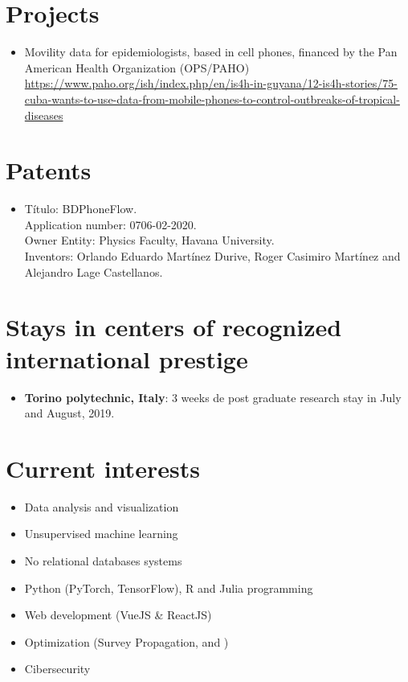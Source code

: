 \documentclass[11pt]{article} %
\begin{document}
\section*{Projects}

\begin{itemize}
	\item Movility data for epidemiologists, based in cell phones, financed by the Pan American Health Organization (OPS/PAHO)\\ \href{https://www.paho.org/ish/index.php/en/is4h-in-guyana/12-is4h-stories/75-cuba-wants-to-use-data-from-mobile-phones-to-control-outbreaks-of-tropical-diseases}{https://www.paho.org/ish/index.php/en/is4h-in-guyana/12-is4h-stories/75-cuba-wants-to-use-data-from-mobile-phones-to-control-outbreaks-of-tropical-diseases}
\end{itemize}


\section*{Patents}

\begin{itemize}
	\item T\'itulo: BDPhoneFlow. \\ 
	Application number: 0706-02-2020. \\
	Owner Entity: Physics Faculty, Havana University. \\
	Inventors: Orlando Eduardo Martínez Durive, Roger Casimiro Martínez and Alejandro Lage Castellanos.
\end{itemize}

\section*{Stays in centers of recognized international prestige}

\begin{itemize}
	\item {\bf Torino polytechnic, Italy}: 3 weeks de post graduate research stay in July and August, 2019.
\end{itemize}

\section*{Current interests}

\begin{itemize}
	\item Data analysis and visualization
	\item Unsupervised machine learning 
	\item No relational databases systems
	\item Python (PyTorch, TensorFlow), R and Julia programming
	\item Web development (VueJS \& ReactJS)
	\item Optimization (Survey Propagation, and )
	\item Cibersecurity
\end{itemize}
\end{document}

